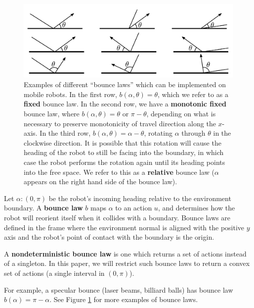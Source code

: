\documentclass[]{styles/svproc}  %
\begin{document}
\begin{figure}
    \includegraphics[width=0.8\linewidth]{figures/bounce_examples.pdf}
    \centering
    \caption[test]{\label{fig:bex}Examples of different ``bounce laws'' which can be implemented on
mobile robots. In the first row, $b(\alpha, \theta) = \theta$, which we refer to
as a \textbf{fixed} bounce law. In the second row, we have a \textbf{monotonic
fixed} bounce law, where
$b(\alpha, \theta) = \theta$ or $\pi-\theta$, depending on what is necessary to
preserve monotonicity of travel direction along the $x$-axis. In the third
row, $b(\alpha, \theta) = \alpha - \theta$, rotating $\alpha$ through $\theta$ in the clockwise
direction. It is possible that this rotation will cause the 
heading of the robot to still be facing into the boundary, in which case the robot 
performs the rotation again until its heading points into the free space. We
refer to this as a \textbf{relative} bounce law ($\alpha$ appears on the
right hand side of the bounce law).
}
\end{figure}

\begin{definition}
Let $\alpha: (0,\pi)$ be the robot's incoming heading relative to the
environment boundary. A \textbf{bounce law} $b$ maps $\alpha$ to an action
$u$, and determines how the robot will reorient itself when it collides with a
boundary. Bounce laws are defined in the
frame where the environment normal is aligned with the positive $y$ axis and the
robot's point of contact with the boundary is the origin.
\end{definition}

\begin{definition}
A \textbf{nondeterministic bounce law} is one which returns a set of actions
instead of a singleton. In this paper, we will restrict such bounce laws to
return a convex set of actions (a single interval in $(0, \pi)$).
\end{definition}

For example, a specular bounce (laser beams, billiard balls) has bounce law
$b(\alpha) = \pi - \alpha$. See Figure \ref{fig:bex} for more
examples of bounce laws. 
\end{document}
